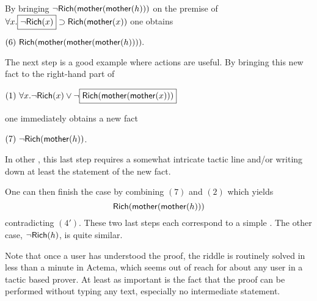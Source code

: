 By bringing 
$\neg\mbox{\textsf{Rich}}(\mbox{\textsf{mother}}(\mbox{\textsf{mother}}(h)))$ on the premise of $\forall
x. \fbox{$\neg\mbox{\textsf{Rich}}(x)$} \supset \mbox{\textsf{Rich}}(\mbox{\textsf{mother}}(x))$
one obtains

\medskip
$(6) ~\mbox{\textsf{Rich}}(\mbox{\textsf{mother}}(\mbox{\textsf{mother}}(\mbox{\textsf{mother}}(h)))).$
\medskip

The next step is a good example where  actions are useful. By bringing this
new fact to the right-hand part of

\medskip
$(1)~\forall x. \neg\mbox{\textsf{Rich}}(x)\lor \neg\fbox{$\mbox{\textsf{Rich}}(\mbox{\textsf{mother}}(\mbox{\textsf{mother}}(x)))$}$
\medskip

\noindent
one immediately obtains a new fact

\medskip
$(7) ~\neg{\mbox{\textsf{Rich}}(\mbox{\textsf{mother}}(h))}$.
\medskip

\noindent In other , this last step requires a somewhat intricate
tactic line and/or writing down at least the statement of the new fact.

One can then finish the case by combining $(7)$ and $(2)$ which yields
$$\mbox{\textsf{Rich}}(\mbox{\textsf{mother}}(\mbox{\textsf{mother}}(h)))$$ contradicting $(4')$. These two last steps each
correspond to a simple . The other case, $\neg\mbox{\textsf{Rich}}(h)$, is quite similar.

Note that once a user has understood the proof, the riddle is routinely solved
in less than a minute in Actema, which seems out of reach for about any user in
a tactic based prover. At least as important is the fact that the proof can be
performed without typing any text, especially no intermediate statement. 

